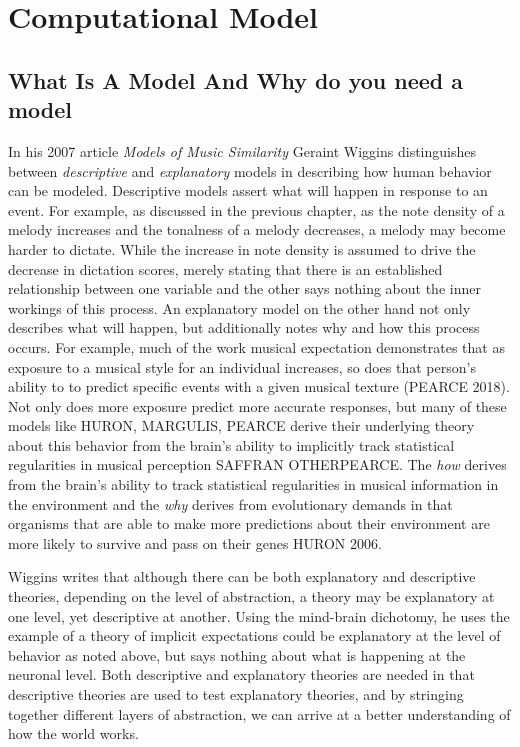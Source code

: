 \documentclass[]{book}
\theoremstyle{definition}
\theoremstyle{definition}
\theoremstyle{definition}
\theoremstyle{remark}
\begin{document}
\hypertarget{computational-model}{%
\chapter{Computational Model}\label{computational-model}}

\hypertarget{what-is-a-model-and-why-do-you-need-a-model}{%
\section{What Is A Model And Why do you need a
model}\label{what-is-a-model-and-why-do-you-need-a-model}}

In his 2007 article \emph{Models of Music Similarity}
\citep{wigginsModelsMusicalSimilarity2007} Geraint Wiggins distinguishes
between \emph{descriptive} and \emph{explanatory} models in describing
how human behavior can be modeled. Descriptive models assert what will
happen in response to an event. For example, as discussed in the
previous chapter, as the note density of a melody increases and the
tonalness of a melody decreases, a melody may become harder to dictate.
While the increase in note density is assumed to drive the decrease in
dictation scores, merely stating that there is an established
relationship between one variable and the other says nothing about the
inner workings of this process. An explanatory model on the other hand
not only describes what will happen, but additionally notes why and how
this process occurs. For example, much of the work musical expectation
demonstrates that as exposure to a musical style for an individual
increases, so does that person's ability to to predict specific events
with a given musical texture (PEARCE 2018). Not only does more exposure
predict more accurate responses, but many of these models like HURON,
MARGULIS, PEARCE derive their underlying theory about this behavior from
the brain's ability to implicitly track statistical regularities in
musical perception SAFFRAN OTHERPEARCE. The \emph{how} derives from the
brain's ability to track statistical regularities in musical information
in the environment and the \emph{why} derives from evolutionary demands
in that organisms that are able to make more predictions about their
environment are more likely to survive and pass on their genes HURON
2006.

Wiggins writes that although there can be both explanatory and
descriptive theories, depending on the level of abstraction, a theory
may be explanatory at one level, yet descriptive at another. Using the
mind-brain dichotomy, he uses the example of a theory of implicit
expectations could be explanatory at the level of behavior as noted
above, but says nothing about what is happening at the neuronal level.
Both descriptive and explanatory theories are needed in that descriptive
theories are used to test explanatory theories, and by stringing
together different layers of abstraction, we can arrive at a better
understanding of how the world works.
\end{document}
